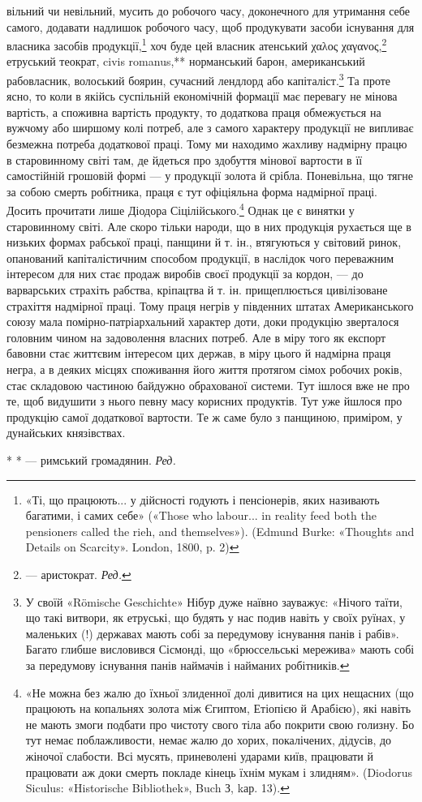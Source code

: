 \parcont{}  %
вільний чи невільний, мусить до робочого часу, доконечного для
утримання себе самого, додавати надлишок робочого часу, щоб
продукувати засоби існування для власника засобів продукції,\footnote{
«Ті, що працюють... у дійсності годують і пенсіонерів, яких називають
багатими, і самих себе» («Those who labour... in reality feed both
the pensioners called the rieh, and themselves»). (Edmund Burke: «Thoughts and
Details on Scarcity». London, 1800, p. 2)
}
хоч буде цей власник атенський χαλος χαγανος,\footnote*{
— аристократ. \emph{Ред.}
} етруський теократ,
civis romanus,** норманський барон, американський рабовласник,
волоський боярин, сучасний лендлорд або капіталіст.\footnote{
У своїй «Römische Geschichte» Нібур дуже наївно зауважує: «Нічого
таїти, що такі витвори, як етруські, що будять у нас подив навіть у
своїх руїнах, у маленьких (!) державах мають собі за передумову існування
панів і рабів». Багато глибше висловився Сісмонді, що «брюссельські
мережива» мають собі за передумову існування панів наймачів і найманих
робітників.
}
Та проте ясно, то коли в якійсь суспільній економічній формації
має перевагу не мінова вартість, а споживна вартість продукту,
то додаткова праця обмежується на вужчому або ширшому колі
потреб, але з самого характеру продукції не випливає безмежна
потреба додаткової праці. Тому ми находимо жахливу надмірну
працю в старовинному світі там, де йдеться про здобуття мінової
вартости в її самостійній грошовій формі — у продукції золота
й срібла. Поневільна, що тягне за собою смерть робітника, праця
є тут офіціяльна форма надмірної праці. Досить прочитати лише
Діодора Сіцілійського.\footnote{
«Не можна без жалю до їхньої злиденної долі дивитися на цих нещасних
(що працюють на копальнях золота між Єгиптом, Етіопією й
Арабією), які навіть не мають змоги подбати про чистоту свого тіла або
покрити свою голизну. Бо тут немає поблажливости, немає жалю до
хорих, покалічених, дідусів, до жіночої слабости. Всі мусять, приневолені
ударами київ, працювати й працювати аж доки смерть покладе кінець
їхнім мукам і злидням». (Diodorus Siculus: «Historische Bibliothek», Buch З,
kар. 13).
} Однак це є винятки у старовинному
світі. Але скоро тільки народи, що в них продукція рухається
ще в низьких формах рабської праці, панщини й т. ін., втягуються
у світовий ринок, опанований капіталістичним способом продукції,
в наслідок чого переважним інтересом для них стає продаж виробів
своєї продукції за кордон, — до варварських страхіть рабства,
кріпацтва й т. ін. прищеплюється цивілізоване страхіття надмірної
праці. Тому праця негрів у південних штатах Американського
союзу мала помірно-патріархальний характер доти, доки продукцію
зверталося головним чином на задоволення власних потреб.
Але в міру того як експорт бавовни стає життєвим інтересом цих
держав, в міру цього й надмірна праця негра, а в деяких місцях
споживання його життя протягом сімох робочих років, стає складовою
частиною байдужно обрахованої системи. Тут ішлося вже
не про те, щоб видушити з нього певну масу корисних продуктів.
Тут уже йшлося про продукцію самої додаткової вартости. Те ж
саме було з панщиною, приміром, у дунайських князівствах.

* * — римський громадянин. \emph{Ред.}
